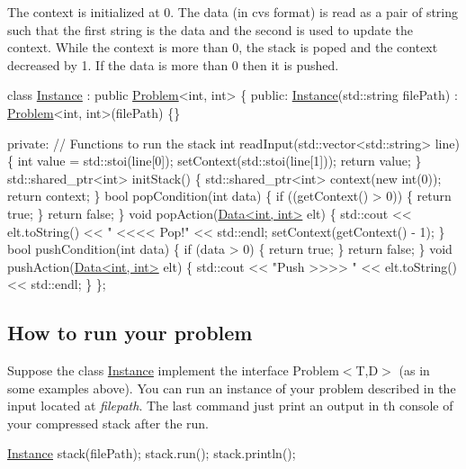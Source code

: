 The context is initialized at 0. The data (in cvs format) is read as a pair of string such that the first string is the data and the second is used to update the context. While the context is more than 0, the stack is poped and the context decreased by 1. If the data is more than 0 then it is pushed. 
\begin{DoxyCode}
\textcolor{keyword}{class }\hyperlink{class_instance}{Instance} : \textcolor{keyword}{public} \hyperlink{class_problem}{Problem}<int, int> \{
\textcolor{keyword}{public}:
  \hyperlink{class_instance}{Instance}(std::string filePath) : \hyperlink{class_problem}{Problem}<int, int>(filePath) \{\}

\textcolor{keyword}{private}:
  \textcolor{comment}{// Functions to run the stack}
  \textcolor{keywordtype}{int} readInput(std::vector<std::string> line) \{
    \textcolor{keywordtype}{int} value = std::stoi(line[0]);
    setContext(std::stoi(line[1]));
    \textcolor{keywordflow}{return} value;
  \}
  std::shared\_ptr<int> initStack() \{
    std::shared\_ptr<int> context(\textcolor{keyword}{new} \textcolor{keywordtype}{int}(0));
    \textcolor{keywordflow}{return} context;
  \}
  \textcolor{keywordtype}{bool} popCondition(\textcolor{keywordtype}{int} data) \{
    \textcolor{keywordflow}{if} ((getContext() > 0)) \{
      \textcolor{keywordflow}{return} \textcolor{keyword}{true};
    \}
    \textcolor{keywordflow}{return} \textcolor{keyword}{false};
  \}
  \textcolor{keywordtype}{void} popAction(\hyperlink{class_data}{Data<int, int>} elt) \{
    std::cout << elt.toString() << \textcolor{stringliteral}{" <<<< Pop!"} << std::endl;
    setContext(getContext() - 1);
  \}
  \textcolor{keywordtype}{bool} pushCondition(\textcolor{keywordtype}{int} data) \{
    \textcolor{keywordflow}{if} (data > 0) \{
      \textcolor{keywordflow}{return} \textcolor{keyword}{true};
    \}
    \textcolor{keywordflow}{return} \textcolor{keyword}{false};
  \}
  \textcolor{keywordtype}{void} pushAction(\hyperlink{class_data}{Data<int, int>} elt) \{
    std::cout << \textcolor{stringliteral}{"Push >>>> "} << elt.toString() << std::endl;
  \}
\};
\end{DoxyCode}


\subsection*{How to run your problem}

Suppose the class \hyperlink{class_instance}{Instance} implement the interface Problem$<$\+T,\+D$>$ (as in some examples above). You can run an instance of your problem described in the input located at {\itshape filepath}. The last command just print an output in th console of your compressed stack after the run.


\begin{DoxyCode}
\hyperlink{class_instance}{Instance} stack(filePath);
stack.run();
stack.println();
\end{DoxyCode}
 